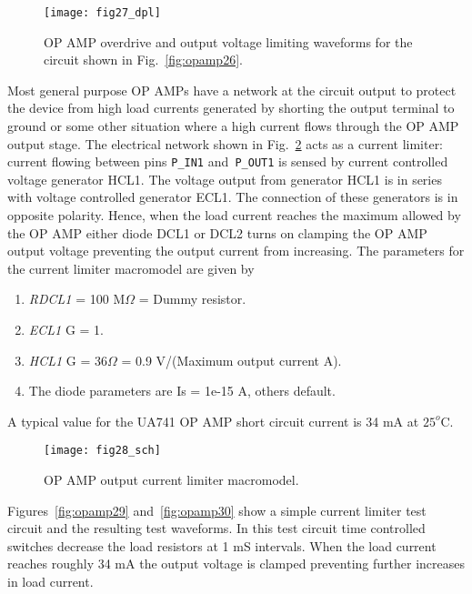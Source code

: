 \begin{figure}
  \centering
  \texttt{[image: fig27\_dpl]}
  \caption{OP AMP overdrive and output voltage limiting waveforms for the circuit shown in Fig.~\ref{fig:opamp26}.}
  \label{fig:opamp27}
\end{figure}


Most general purpose OP AMPs have a network at the circuit output to protect the device from high load currents generated by shorting the output terminal to ground or some other situation where a high current flows through the OP AMP output stage. The electrical network shown in Fig.~\ref{fig:opamp28} acts as a current limiter: current flowing between pins \verb|P_IN1| and\verb| P_OUT1| is sensed by current controlled voltage generator HCL1. The voltage output from generator HCL1 is in series with voltage controlled generator ECL1. The connection of these generators is in opposite polarity. Hence, when the load current reaches the maximum allowed by the OP AMP either diode DCL1 or DCL2 turns on clamping the OP AMP output voltage preventing the output current from increasing.  The parameters for the current limiter macromodel are given by

\begin{enumerate}
\item \textit{RDCL1} = 100 M$\Omega$ = Dummy resistor.
\item \textit{ECL1}   G = 1.
\item \textit{HCL1}   G = 36$\Omega$ = 0.9 V/(Maximum output current A).
\item The diode parameters are Is = 1e-15 A, others default.
\end{enumerate}
 
A typical value for the UA741 OP AMP short circuit current is 34 mA at $25^{o}$C.\\



\begin{figure}
  \centering
  \texttt{[image: fig28\_sch]}
  \caption{OP AMP output current limiter macromodel.} 
  \label{fig:opamp28}
\end{figure}
 Figures~\ref{fig:opamp29} and~\ref{fig:opamp30} show a simple current limiter test circuit and the resulting test waveforms.  
 In this test circuit time controlled switches decrease the load resistors at 1 mS intervals. When the load current reaches
 roughly 34 mA the output voltage is clamped preventing further increases in load current.

